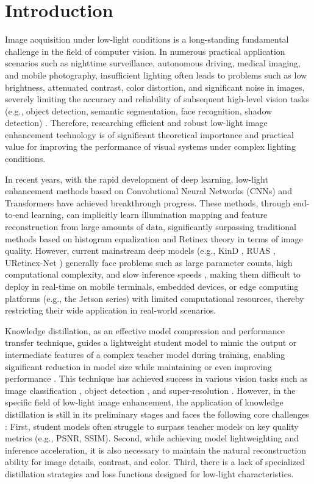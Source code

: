 \documentclass[sensors,article,submit,moreauthors]{Definitions/mdpi}
\begin{document}
\section{Introduction}

Image acquisition under low-light conditions is a long-standing fundamental challenge in the field of computer vision. In numerous practical application scenarios such as nighttime surveillance, autonomous driving, medical imaging, and mobile photography, insufficient lighting often leads to problems such as low brightness, attenuated contrast, color distortion, and significant noise in images, severely limiting the accuracy and reliability of subsequent high-level vision tasks (e.g., object detection, semantic segmentation, face recognition, shadow detection) \cite{ref1,ref2,ref3,ref4,ref5}. Therefore, researching efficient and robust low-light image enhancement technology is of significant theoretical importance and practical value for improving the performance of visual systems under complex lighting conditions.

In recent years, with the rapid development of deep learning, low-light enhancement methods based on Convolutional Neural Networks (CNNs) and Transformers have achieved breakthrough progress. These methods, through end-to-end learning, can implicitly learn illumination mapping and feature reconstruction from large amounts of data, significantly surpassing traditional methods based on histogram equalization \cite{ref28} and Retinex theory \cite{ref7} in terms of image quality. However, current mainstream deep models (e.g., KinD \cite{ref8}, RUAS \cite{ref9}, URetinex-Net \cite{ref10}) generally face problems such as large parameter counts, high computational complexity, and slow inference speeds \cite{ref11}, making them difficult to deploy in real-time on mobile terminals, embedded devices, or edge computing platforms (e.g., the Jetson series) with limited computational resources, thereby restricting their wide application in real-world scenarios.

Knowledge distillation, as an effective model compression and performance transfer technique, guides a lightweight student model to mimic the output or intermediate features of a complex teacher model during training, enabling significant reduction in model size while maintaining or even improving performance \cite{ref12,ref13}. This technique has achieved success in various vision tasks such as image classification \cite{ref14,ref15}, object detection \cite{ref16,ref17,ref18}, and super-resolution \cite{ref19,ref20,ref21}. However, in the specific field of low-light image enhancement, the application of knowledge distillation is still in its preliminary stages and faces the following core challenges \cite{ref22,ref23,ref24}: First, student models often struggle to surpass teacher models on key quality metrics (e.g., PSNR, SSIM). Second, while achieving model lightweighting and inference acceleration, it is also necessary to maintain the natural reconstruction ability for image details, contrast, and color. Third, there is a lack of specialized distillation strategies and loss functions designed for low-light characteristics.
\end{document}
